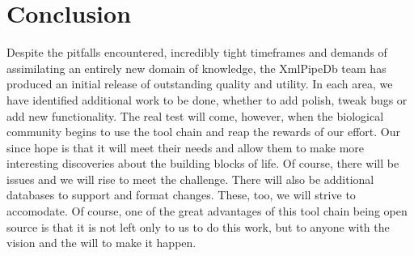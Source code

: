 \documentclass[11pt]{article}
\begin{document}
\section{Conclusion}
Despite the pitfalls encountered, incredibly tight timeframes and demands of assimilating an entirely new domain of knowledge, the XmlPipeDb team has produced an initial release of outstanding quality and utility. In each area, we have identified additional work to be done, whether to add polish, tweak bugs or add new functionality. The real test will come, however, when the biological community begins to use the tool chain and reap the rewards of our effort. Our since hope is that it will meet their needs and allow them to make more interesting discoveries about the building blocks of life. Of course, there will be issues and we will rise to meet the challenge. There will also be additional databases to support and format changes. These, too, we will strive to accomodate. Of course, one of the great advantages of this tool chain being open source is that it is not left only to us to do this work, but to anyone with the vision and the will to make it happen.



\pagebreak


\end{document}
